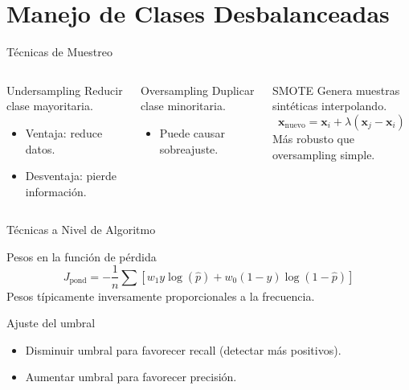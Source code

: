 \documentclass[aspectratio=169, 10pt, xcolor=table]{beamer}
\begin{document}
\section{Manejo de Clases Desbalanceadas}

\begin{frame}{Técnicas de Muestreo}
    \begin{columns}[t]
        \begin{block}{Undersampling}
            Reducir clase mayoritaria.
            \begin{itemize}
                \item Ventaja: reduce datos.
                \item Desventaja: pierde información.
            \end{itemize}
        \end{block}
        \begin{block}{Oversampling}
            Duplicar clase minoritaria.
            \begin{itemize}
                \item Puede causar sobreajuste.
            \end{itemize}
        \end{block}
        \begin{block}{SMOTE}
            Genera muestras sintéticas interpolando.
            \[
            \mathbf{x}_{\text{nuevo}} = \mathbf{x}_i + \lambda(\mathbf{x}_j - \mathbf{x}_i)
            \]
            Más robusto que oversampling simple.
        \end{block}
    \end{columns}
\end{frame}

\begin{frame}{Técnicas a Nivel de Algoritmo}
    \begin{block}{Pesos en la función de pérdida}
        \[
        J_{\text{pond}} = -\frac{1}{n} \sum \left[ w_1 y \log(\hat{p}) + w_0 (1-y) \log(1-\hat{p}) \right]
        \]
        Pesos típicamente inversamente proporcionales a la frecuencia.
    \end{block}
    \begin{block}{Ajuste del umbral}
        \begin{itemize}
            \item Disminuir umbral para favorecer recall (detectar más positivos).
            \item Aumentar umbral para favorecer precisión.
        \end{itemize}
    \end{block}
\end{frame}
\end{document}
